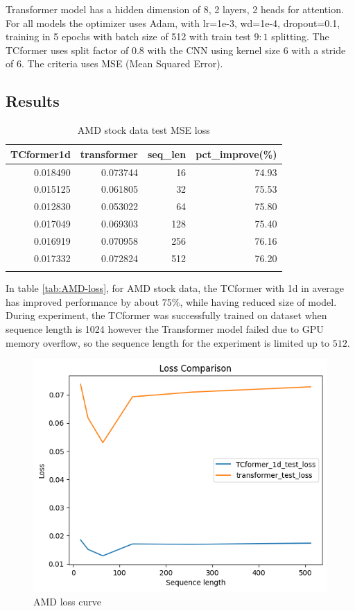 \documentclass[stu,12pt,floatsintext]{apa7}
\begin{document}
Transformer model has a hidden dimension of 8, 2 layers, 2 heads for attention. For all models the optimizer uses Adam, with lr=1e-3, wd=1e-4, dropout=0.1, training in 5 epochs with batch size of 512 with train test $9:1$ splitting. The TCformer uses split factor of 0.8 with the CNN using kernel size 6 with a stride of 6. The criteria uses MSE (Mean Squared Error). 

\subsection{Results}

\begin{table}[H]
\caption{AMD stock data test MSE loss}
\centering
\label{tab:AMD-loss}
\begin{tabular}{rrrr}
\toprule
TCformer1d & transformer & seq\_len & pct\_improve(\%) \\
\midrule
0.018490 & 0.073744 & 16 & 74.93 \\
0.015125 & 0.061805 & 32 & 75.53 \\
0.012830 & 0.053022 & 64 & 75.80 \\
0.017049 & 0.069303 & 128 & 75.40 \\
0.016919 & 0.070958 & 256 & 76.16 \\
0.017332 & 0.072824 & 512 & 76.20 \\
\bottomrule \\
\end{tabular}
\label{tab:comparison}
\end{table}

In table \ref{tab:AMD-loss}, for AMD stock data, the TCformer with 1d in average has improved performance by about 75\%, while having reduced size of model. During experiment, the TCformer was successfully trained on dataset when sequence length is 1024 however the Transformer model failed due to GPU memory overflow, so the sequence length for the experiment is limited up to $512$.

\begin{figure}[H]
    \centering
    \includegraphics[width=0.8\linewidth]{images/AMD-loss-cmp.png}
    \caption{AMD loss curve}
    \label{fig:AMD-loss-curve}
\end{figure}
\end{document}
